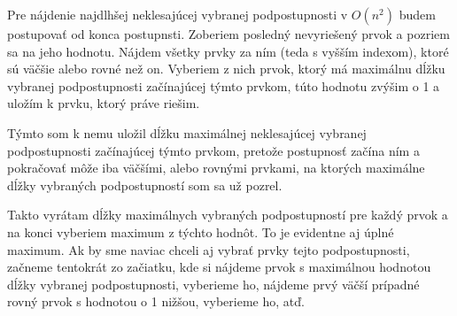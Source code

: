 
Pre nájdenie najdlhšej neklesajúcej vybranej podpostupnosti v $O(n^2)$ 
budem postupovať od konca postupnsti. Zoberiem posledný nevyriešený 
prvok a pozriem sa na jeho hodnotu. Nájdem všetky prvky za ním (teda 
s vyšším indexom), ktoré sú väčšie alebo rovné než on. Vyberiem z nich 
prvok, ktorý má maximálnu dĺžku vybranej podpostupnosti začínajúcej 
týmto prvkom, túto hodnotu zvýšim o 1 a uložím k prvku, ktorý práve 
riešim. 

Týmto som k nemu uložil dĺžku maximálnej neklesajúcej vybranej 
podpostupnosti začínajúcej týmto prvkom, pretože postupnosť začína ním 
a pokračovať môže iba väčšími, alebo rovnými prvkami, na ktorých 
maximálne dĺžky vybraných podpostupností som sa už pozrel. 

Takto vyrátam dĺžky maximálnych vybraných podpostupností pre každý prvok 
a na konci vyberiem maximum z týchto hodnôt. To je evidentne aj úplné 
maximum. Ak by sme naviac chceli aj vybrať prvky tejto podpostupnosti, 
začneme tentokrát zo začiatku, kde si nájdeme prvok s maximálnou 
hodnotou dĺžky vybranej podpostupnosti, vyberieme ho, nájdeme prvý väčší 
prípadné rovný prvok s hodnotou o 1 nižšou, vyberieme ho, atď.

